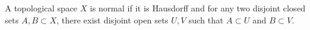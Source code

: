 A topological space $X$ is normal if it is Hausdorff and for any two disjoint closed sets $A, B \subset X$, there exist disjoint open sets $U, V$ such that $A \subset U$ and $B \subset V$.
